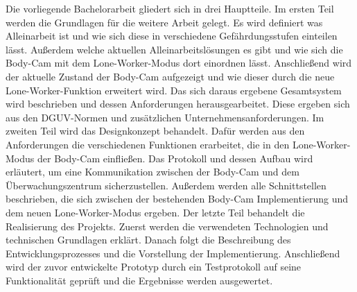 \documentclass[thesis.tex]{subfiles}
\begin{document}
Die vorliegende Bachelorarbeit gliedert sich in drei Hauptteile.
Im ersten Teil werden die Grundlagen für die weitere Arbeit gelegt.
Es wird definiert was Alleinarbeit ist und wie sich diese in verschiedene Gefährdungsstufen einteilen lässt.
Außerdem welche aktuellen Alleinarbeitslösungen es gibt und wie sich die Body-Cam mit dem Lone-Worker-Modus dort einordnen lässt.
Anschließend wird der aktuelle Zustand der Body-Cam aufgezeigt und wie dieser durch die neue Lone-Worker-Funktion erweitert wird.
Das sich daraus ergebene Gesamtsystem wird beschrieben und dessen Anforderungen herausgearbeitet.
Diese ergeben sich aus den DGUV-Normen und zusätzlichen Unternehmensanforderungen.
Im zweiten Teil wird das Designkonzept behandelt.
Dafür werden aus den Anforderungen die verschiedenen Funktionen erarbeitet, die in den Lone-Worker-Modus der Body-Cam einfließen.
Das Protokoll und dessen Aufbau wird erläutert, um eine Kommunikation zwischen der Body-Cam und dem Überwachungszentrum sicherzustellen.
Außerdem werden alle Schnittstellen beschrieben, die sich zwischen der bestehenden Body-Cam Implementierung und dem neuen Lone-Worker-Modus ergeben.
Der letzte Teil behandelt die Realisierung des Projekts.
Zuerst werden die verwendeten Technologien und technischen Grundlagen erklärt.
Danach folgt die Beschreibung des Entwicklungsprozesses und die Vorstellung der Implementierung.
Anschließend wird der zuvor entwickelte Prototyp durch ein Testprotokoll auf seine Funktionalität geprüft und die Ergebnisse werden ausgewertet.



\subfilebib %
\end{document}
